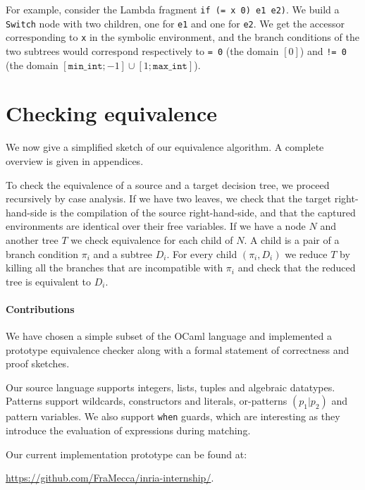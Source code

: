 \documentclass[12pt]{article}
\begin{document}
For example, consider the Lambda fragment
%
\lstinline{if (= x 0) e1 e2)}.
%
We build a \lstinline{Switch} node with two children, one for
\lstinline{e1} and one for \lstinline{e2}. We get the accessor
corresponding to \lstinline{x} in the symbolic environment, and the
branch conditions of the two subtrees would correspond respectively to
\lstinline{= 0} (the domain $[0]$) and \lstinline{!= 0} (the domain
$[\mathtt{min\_int}; -1] \cup [1; \mathtt{max\_int}]$).

\section{Checking equivalence}

We now give a simplified sketch of our equivalence
algorithm. A complete overview is given in appendices.

To check the equivalence of a source and a target decision tree,
we proceed recursively by case analysis.
%
If we have two leaves, we check that the target right-hand-side is the
compilation of the source right-hand-side, and that the captured
environments are identical over their free variables.
%
If we have a node $N$ and another tree $T$ we check equivalence for
each child of $N$. A child is a pair of a branch condition $\pi_i$ and a
subtree $D_i$. For every child $(\pi_i, D_i)$ we reduce $T$ by killing all
the branches that are incompatible with $\pi_i$ and check that the
reduced tree is equivalent to $D_i$.

\paragraph{Contributions} We have chosen a simple subset of the OCaml
language and implemented a prototype equivalence checker along with
a formal statement of correctness and proof sketches.

Our source language supports integers, lists, tuples and algebraic
datatypes. Patterns support wildcards, constructors and literals,
or-patterns $(p_1 | p_2)$ and pattern variables.  We also support
\texttt{when} guards, which are interesting as they introduce the
evaluation of expressions during matching.

Our current implementation prototype can be found at:
\begin{center}
  \url{https://github.com/FraMecca/inria-internship/}.
\end{center}

\newpage
\appendix
\end{document}
